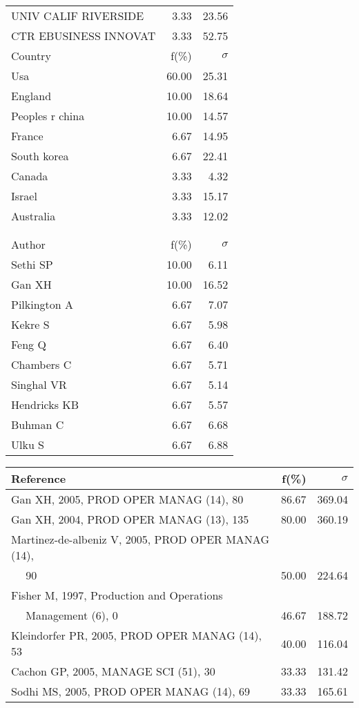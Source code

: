 \documentclass[a4paper,11pt]{report}
\begin{document}
\begin{landscape}
\begin{table}[!ht]
{\begin{tabular}{|l r r|}
UNIV CALIF RIVERSIDE & 3.33 & 23.56\\
CTR EBUSINESS INNOVAT & 3.33 & 52.75\\
\hline
\hline
Country & f(\%) & $\sigma$\\
\hline
Usa & 60.00 & 25.31\\
England & 10.00 & 18.64\\
Peoples r china & 10.00 & 14.57\\
France & 6.67 & 14.95\\
South korea & 6.67 & 22.41\\
Canada & 3.33 & 4.32\\
Israel & 3.33 & 15.17\\
Australia & 3.33 & 12.02\\
 &  & \\
 &  & \\
\hline
\hline
Author & f(\%) & $\sigma$\\
\hline
Sethi SP & 10.00 & 6.11\\
Gan XH & 10.00 & 16.52\\
Pilkington A & 6.67 & 7.07\\
Kekre S & 6.67 & 5.98\\
Feng Q & 6.67 & 6.40\\
Chambers C & 6.67 & 5.71\\
Singhal VR & 6.67 & 5.14\\
Hendricks KB & 6.67 & 5.57\\
Buhman C & 6.67 & 6.68\\
Ulku S & 6.67 & 6.88\\
\hline
\end{tabular}
}
{\scriptsize\begin{tabular}{|l r r|}
\hline
Reference & f(\%) & $\sigma$\\
\hline
Gan XH, 2005, PROD OPER MANAG (14), 80 & 86.67 & 369.04\\
Gan XH, 2004, PROD OPER MANAG (13), 135 & 80.00 & 360.19\\
Martinez-de-albeniz V, 2005, PROD OPER MANAG (14), &  & \\
$\quad$ 90 & 50.00 & 224.64\\
Fisher M, 1997, Production and Operations &  & \\
$\quad$ Management (6), 0 & 46.67 & 188.72\\
Kleindorfer PR, 2005, PROD OPER MANAG (14), 53 & 40.00 & 116.04\\
Cachon GP, 2005, MANAGE SCI (51), 30 & 33.33 & 131.42\\
Sodhi MS, 2005, PROD OPER MANAG (14), 69 & 33.33 & 165.61\\

\end{tabular}}
\end{table}
\end{landscape}
\end{document}
